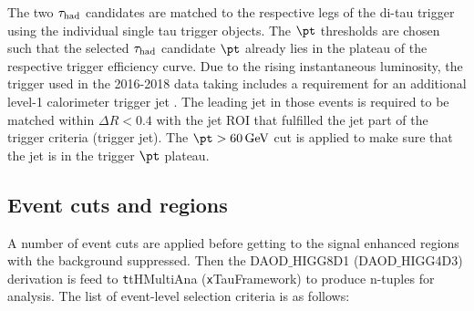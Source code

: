 The two $\tau_\text{had}$ candidates are matched to the respective legs of the di-tau trigger using the individual single tau trigger objects. The $\pt$ thresholds are chosen such that the selected $\tau_\text{had}$ candidate $\pt$ already lies in the plateau of the respective trigger efficiency curve. Due to the rising instantaneous luminosity, the trigger used in the 2016-2018 data taking includes a requirement for an additional level-1 calorimeter trigger jet 
. The leading jet in those events is required to be matched within $\Delta R < 0.4$ with the jet ROI that fulfilled the jet part of the trigger criteria (trigger jet). The $\pt > \SI{60}{\GeV}$ cut is applied to make sure that the jet is in the trigger $\pt$ plateau.

\subsection{Event cuts and regions}
\label{sec:cuts}

A number of event cuts are applied before getting to the signal enhanced regions with the background suppressed. Then the DAOD$\_$HIGG8D1 (DAOD$\_$HIGG4D3) derivation is feed to {\texttt ttHMultiAna} ({\texttt xTauFramework}) to produce n-tuples for analysis. The list of event-level selection criteria is as follows:

